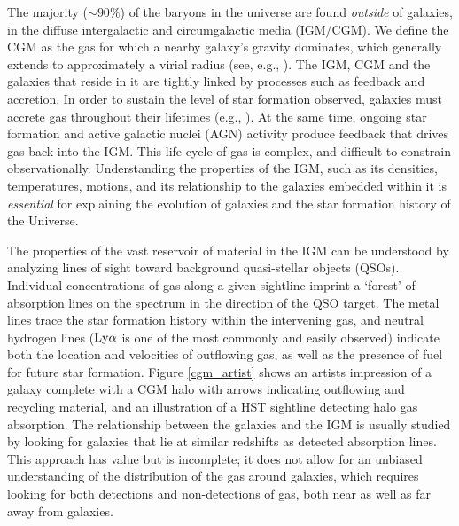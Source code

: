 The majority ($\sim 90\%$) of the baryons in the universe are found \emph{outside} of galaxies, in the diffuse intergalactic and circumgalactic media (IGM/CGM). We define the CGM as the gas for which a nearby galaxy's gravity dominates, which generally extends to approximately a virial radius (see, e.g., \citealt{shull2014}). The IGM, CGM and the galaxies that reside in it are tightly linked by processes such as feedback and accretion. In order to sustain the level of star formation observed, galaxies must accrete gas throughout their lifetimes (e.g., \citealt{oort1966, oort1969, oort1970, tinsley1978, tinsley1980, wakker1999, erb2008, prochaska2009}). At the same time, ongoing star formation and active galactic nuclei (AGN) activity produce feedback that drives gas back into the IGM. This life cycle of gas is complex, and difficult to constrain observationally. Understanding the properties of the IGM, such as its densities, temperatures, motions, and its relationship to the galaxies embedded within it is \emph{essential} for explaining the evolution of galaxies and the star formation history of the Universe. 

The properties of the vast reservoir of material in the IGM can be understood by analyzing lines of sight toward background quasi-stellar objects (QSOs). Individual concentrations of gas along a given sightline imprint a `forest' of absorption lines on the spectrum in the direction of the QSO target. The metal lines trace the star formation history within the intervening gas, and neutral hydrogen lines ($\rm Ly\alpha$ is one of the most commonly and easily observed) indicate both the location and velocities of outflowing gas, as well as the presence of fuel for future star formation. Figure \ref{cgm_artist} shows an artists impression of a galaxy complete with a CGM halo with arrows indicating outflowing and recycling material, and an illustration of a HST sightline detecting halo gas absorption. The relationship between the galaxies and the IGM is usually studied by looking for galaxies that lie at similar redshifts as detected absorption lines. This approach has value but is incomplete; it does not allow for an unbiased understanding of the distribution of the gas around galaxies, which requires looking for both detections and non-detections of gas, both near as well as far away from galaxies.

